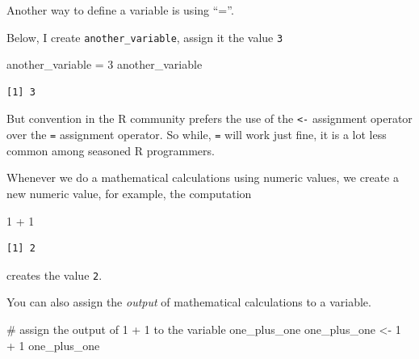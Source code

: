 \documentclass[
  letterpaper,
  DIV=11,
  numbers=noendperiod]{scrreprt}
\newenvironment{Shaded}{\begin{snugshade}}{\end{snugshade}}
\newcommand{\CommentTok}[1]{\textcolor[rgb]{0.37,0.37,0.37}{#1}}
\newcommand{\DecValTok}[1]{\textcolor[rgb]{0.68,0.00,0.00}{#1}}
\newcommand{\NormalTok}[1]{\textcolor[rgb]{0.00,0.23,0.31}{#1}}
\newcommand{\OtherTok}[1]{\textcolor[rgb]{0.00,0.23,0.31}{#1}}
\newcommand{\SpecialCharTok}[1]{\textcolor[rgb]{0.37,0.37,0.37}{#1}}
\begin{document}
\begin{tcolorbox}[enhanced jigsaw, rightrule=.15mm, toptitle=1mm, title=\textcolor{quarto-callout-tip-color}{\faLightbulb}\hspace{0.5em}{Defining variables using \texttt{=}}, leftrule=.75mm, bottomtitle=1mm, colbacktitle=quarto-callout-tip-color!10!white, coltitle=black, titlerule=0mm, opacityback=0, colframe=quarto-callout-tip-color-frame, arc=.35mm, opacitybacktitle=0.6, bottomrule=.15mm, left=2mm, breakable, toprule=.15mm, colback=white]

Another way to define a variable is using ``=''.

Below, I create \texttt{another\_variable}, assign it the value
\texttt{3}

\begin{Shaded}
\begin{Highlighting}[]
\NormalTok{another\_variable }\OtherTok{=} \DecValTok{3}
\NormalTok{another\_variable }
\end{Highlighting}
\end{Shaded}

\begin{verbatim}
[1] 3
\end{verbatim}

But convention in the R community prefers the use of the
\texttt{\textless{}-} assignment operator over the \texttt{=} assignment
operator. So while, \texttt{=} will work just fine, it is a lot less
common among seasoned R programmers.

\end{tcolorbox}

Whenever we do a mathematical calculations using numeric values, we
create a new numeric value, for example, the computation

\begin{Shaded}
\begin{Highlighting}[]
\DecValTok{1} \SpecialCharTok{+} \DecValTok{1}
\end{Highlighting}
\end{Shaded}

\begin{verbatim}
[1] 2
\end{verbatim}

creates the value \texttt{2}.

You can also assign the \emph{output} of mathematical calculations to a
variable.

\begin{Shaded}
\begin{Highlighting}[]
\CommentTok{\# assign the output of 1 + 1 to the variable one\_plus\_one}
\NormalTok{one\_plus\_one }\OtherTok{\textless{}{-}} \DecValTok{1} \SpecialCharTok{+} \DecValTok{1}
\NormalTok{one\_plus\_one}
\end{Highlighting}
\end{Shaded}
\end{document}

